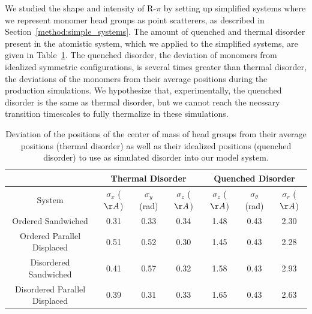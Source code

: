 \documentclass[journal=jpcbfk,manuscript=article]{achemso}
\begin{document}
  We studied the shape and intensity of R-$\pi$ by setting up simplified
  systems where we represent monomer head groups as point scatterers, as
  described in Section~\ref{method:simple_systems}. The amount of quenched and
  thermal disorder present in the atomistic system, which we applied to the
  simplified systems, are given in Table~\ref{table:quenched_disorder}. The
  quenched disorder, the deviation of monomers from idealized symmetric
  configurations, is several times greater than thermal disorder, the 
  deviations of the monomers from their average positions during the 
  production simulations. We hypothesize that, experimentally, the quenched disorder is the 
  same as thermal disorder, but we cannot reach the necssary transition
  timescales to fully thermalize in these simulations.  
  
  \begin{table}[h]
  \centering
  \begin{tabular}{c|ccc|ccc}
  \toprule
   		                        &           \multicolumn{3}{c}{Thermal Disorder}             &             \multicolumn{3}{c}{Quenched Disorder}               \\
  \midrule
  System                        & $\sigma_x$ ($\AA$) & $\sigma_y$ (rad) & $\sigma_z$ ($\AA$) & $\sigma_z$ ($\AA$) & $\sigma_\theta$ (rad) & $\sigma_r$ ($\AA$) \\
  \midrule
  Ordered Sandwiched            &         0.31       &       0.33       &        0.34        &        1.48        &     0.43              &     2.30           \\
  Ordered Parallel Displaced    &         0.51       &       0.52       &        0.30        &        1.45        &     0.43              &     2.28           \\ 
  Disordered Sandwiched         &         0.41       &       0.57       &        0.32        &        1.58        &     0.43              &     2.93           \\
  Disordered Parallel Displaced &         0.39       &       0.31       &        0.33        &        1.65        &     0.43              &     2.63           \\
  \bottomrule
  \end{tabular}
  \caption{Deviation of the positions of the center of mass of head groups from their average
  positions (thermal disorder) as well as their idealized positions (quenched disorder) to use 
  as simulated disorder into our model system.}
  \label{table:quenched_disorder} 
  \end{table}
\end{document}
